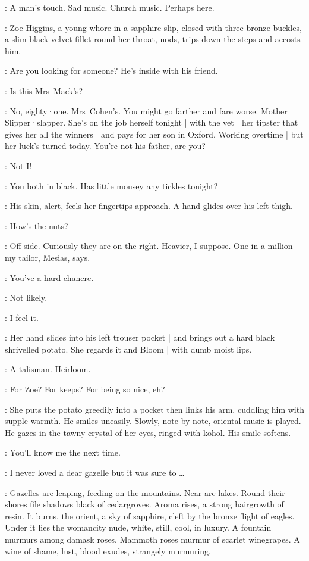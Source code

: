 \Bloom:
A man's touch.
Sad music.
Church music.
Perhaps here.

:
Zoe Higgins,
a young whore in a sapphire slip,
closed with three bronze buckles,
a slim black velvet fillet round her throat,
nods,
trips down the steps and accosts him.

\Zoe:
Are you looking for someone?
He's inside with his friend.

\Bloom:
Is this Mrs~Mack's?

\Zoe:
No,
eighty·one.
Mrs~Cohen's.
You might go farther and fare worse.
Mother Slipper·slapper.
She's on the job herself tonight |
with the vet |
her tipster that gives her all the winners |
and pays for her son in Oxford.
Working overtime |
but her luck's turned today.
You're not his father,
are you?

\Bloom:
Not I!

\Zoe:
You both in black.
Has little mousey any tickles tonight?

:
His skin,
alert,
feels her fingertips approach.
A hand glides over his left thigh.

\Zoe:
How's the nuts?

\Bloom:
Off side.
Curiously they are on the right.
Heavier,
I suppose.
One in a million my tailor,
Mesias,
says.

\Zoe:
You've a hard chancre.

\Bloom:
Not likely.

\Zoe:
I feel it.

:
Her hand slides into his left trouser pocket |
and brings out a hard black shrivelled potato.
She regards it and Bloom |
with dumb moist lips.

\Bloom:
A talisman.
Heirloom.

\Zoe:
For Zoe?
For keeps?
For being so nice,
eh?

:
She puts the potato greedily into a pocket then links his arm,
cuddling him with supple warmth.
He smiles uneasily.
Slowly,
note by note,
oriental music is played.
He gazes in the tawny crystal of her eyes,
ringed with kohol.
His smile softens.

\Zoe:
You'll know me the next time.

\Bloom:
I never loved a dear gazelle but it was sure to \ldots

:
Gazelles are leaping,
feeding on the mountains.
Near are lakes.
Round their shores file shadows black of cedargroves.
Aroma rises,
a strong hairgrowth of resin.
It burns,
the orient,
a sky of sapphire,
cleft by the bronze flight of eagles.
Under it lies the womancity nude,
white,
still,
cool,
in luxury.
A fountain murmurs among damask roses.
Mammoth roses murmur of scarlet winegrapes.
A wine of shame,
lust,
blood exudes,
strangely murmuring.%

